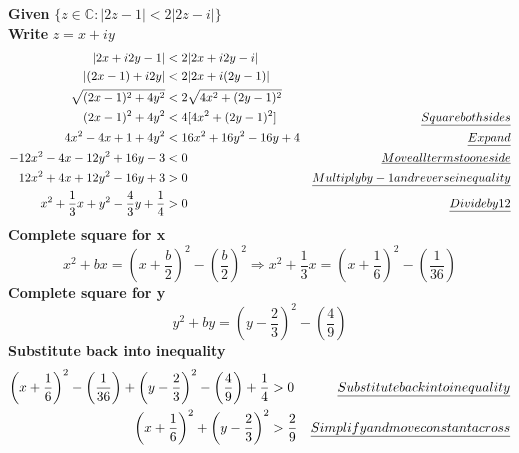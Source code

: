 \documentclass[a4paper, 8pt]{extarticle}
\begin{document}
\begin{examplebox}[2022 Q1(a), 2021 Q1(d), 2017 Q1(a), 2016 Q1(a)]
    \label{sol:2022Q1a}
    \textbf{Given} $\{ z \in \mathbb{C} : |2z - 1| < 2|2z-i|\}$ \\
    \textbf{Write} $z = x + iy$
    \begin{align*}
        |2x + i2y -1 |                                        & < 2 |2x + i2y - i|                                                        \\
        |(2x -1) + i2y|                                       & < 2 |2x + i(2y -1)|                                                       \\
        \sqrt{(2x-1)^2 + 4y^2}                                & < 2 \sqrt{4x^2 + (2y-1)^2}                                                \\
        (2x-1)^2 + 4y^2                                       & < 4[4x^2 + (2y-1)^2]       & \emph{Square both sides}                     \\
        4x^2 - 4x + 1 + 4y^2                                  & < 16x^2 + 16y^2 -16y +4    & \emph{Expand}                                \\
        -12x^2 - 4x - 12y^2 + 16y -3                          & < 0                        & \emph{Move all terms to one side}            \\
        12x^2 + 4x + 12y^2 - 16y + 3                          & > 0                        & \emph{Multiply by -1 and reverse inequality} \\
        x^2 + \frac{1}{3}x + y^2 - \frac{4}{3}y + \frac{1}{4} & > 0                        & \emph{Divide by 12}                          \\
    \end{align*}
    \textbf{Complete square for x}
    $$x^2 + bx = \left(x + \frac{b}{2}\right)^2 - \left(\frac{b}{2}\right)^2 \Rightarrow x^2 + \frac{1}{3}x = \left(x + \frac{1}{6}\right)^2 - \left(\frac{1}{36}\right)$$
    \textbf{Complete square for y}
    $$y^2 + by = \left(y - \frac{2}{3}\right)^2 - \left(\frac{4}{9}\right)$$
    \textbf{Substitute back into inequality}
    \begin{align*}
        \left(x + \frac{1}{6}\right)^2 - \left(\frac{1}{36}\right) + \left(y - \frac{2}{3}\right)^2 - \left(\frac{4}{9}\right)  + \frac{1}{4} & > 0            & \emph{Substitute back into inequality}   \\
        \left(x + \frac{1}{6}\right)^2 + \left(y - \frac{2}{3}\right)^2                                                                       & >  \frac{2}{9} & \emph{Simplify and move constant across} \\
    \end{align*}


\end{examplebox}
\end{document}
